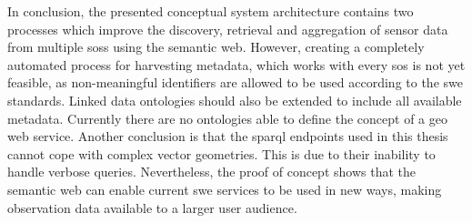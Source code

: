 In conclusion, the presented conceptual system architecture contains two processes which improve the discovery, retrieval and aggregation of sensor data from multiple \aclp*{sos} using the semantic web. However, creating a completely automated process for harvesting metadata, which works with every \acl*{sos} is not yet feasible, as non-meaningful identifiers are allowed to be used according to the \acs*{swe} standards. Linked data ontologies should also be extended to include all available metadata. Currently there are no ontologies able to define the concept of a geo web service. Another conclusion is that the \acs*{sparql} endpoints used in this thesis cannot cope with complex vector geometries. This is due to their inability to handle verbose queries. Nevertheless, the proof of concept shows that the semantic web can enable current \acs*{swe} services to be used in new ways, making observation data available to a larger user audience.  